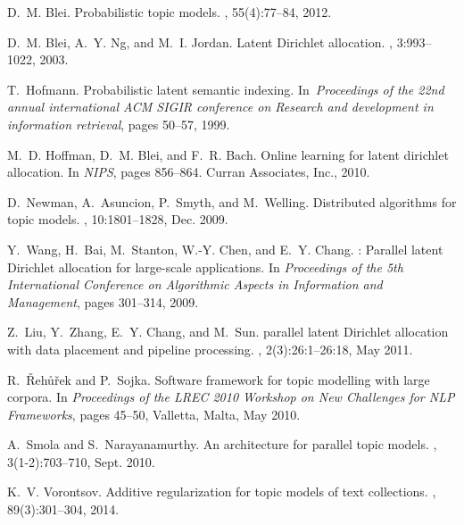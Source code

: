 \documentclass[russian,english]{llncs}
\begin{document}
\begin{thebibliography}{10}

D.~M. Blei.
\newblock Probabilistic topic models.
, 55(4):77--84, 2012.

D.~M. Blei, A.~Y. Ng, and M.~I. Jordan.
\newblock Latent {Dirichlet} allocation.
, 3:993--1022, 2003.

T.~Hofmann.
\newblock Probabilistic latent semantic indexing.
\newblock In~{\em Proceedings of the 22nd annual international ACM SIGIR
	conference on Research and development in information retrieval},
pages 50--57, 1999.

M.~D. Hoffman, D.~M. Blei, and F.~R. Bach.
\newblock Online learning for latent dirichlet allocation.
\newblock In {\em NIPS}, pages 856--864. Curran Associates, Inc., 2010.

D.~Newman, A.~Asuncion, P.~Smyth, and M.~Welling.
\newblock Distributed algorithms for topic models.
, 10:1801--1828, Dec. 2009.

Y.~Wang, H.~Bai, M.~Stanton, W.-Y. Chen, and E.~Y. Chang.
: Parallel latent {D}irichlet allocation for large-scale applications.
\newblock In {\em Proceedings of the 5th International Conference on
	Algorithmic Aspects in Information and Management}, pages 301--314, 2009.

Z.~Liu, Y.~Zhang, E.~Y. Chang, and M.~Sun.
 parallel latent {D}irichlet allocation with data placement and pipeline processing.
, 2(3):26:1--26:18, May 2011.

R.~\v{R}eh\r{u}\v{r}ek and P.~Sojka.
\newblock Software framework for topic modelling with large corpora.
\newblock In {\em Proceedings of the {LREC} 2010 Workshop on New Challenges for
	{NLP} Frameworks}, pages 45--50, Valletta, Malta, May 2010.

A.~Smola and S.~Narayanamurthy.
\newblock An architecture for parallel topic models.
, 3(1-2):703--710, Sept. 2010.

K.~V. Vorontsov.
\newblock Additive regularization for topic models of text collections.
, 89(3):301--304, 2014.


\end{thebibliography}
\end{document}
